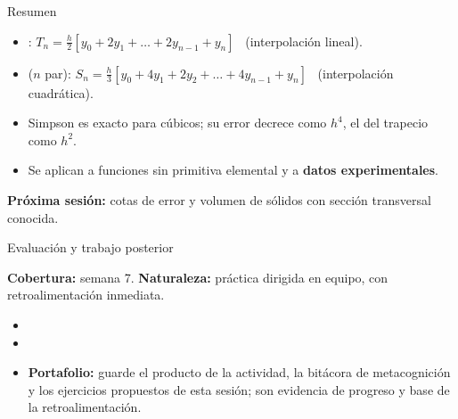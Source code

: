 \documentclass[10pt,aspectratio=169]{beamer}
\begin{document}
\begin{frame}{Resumen}
  \begin{itemize}
    \item {}: $T_n=\frac h2[y_0+2y_1+\dots+2y_{n-1}+y_n]$ \ (interpolación lineal).
    \item {} ($n$ par): $S_n=\frac h3[y_0+4y_1+2y_2+\dots+4y_{n-1}+y_n]$ \ (interpolación cuadrática).
    \item Simpson es exacto para cúbicos; su error decrece como $h^4$, el del trapecio como $h^2$.
    \item Se aplican a funciones sin primitiva elemental y a \textbf{datos experimentales}.
  \end{itemize}
  \vspace{3mm}
  \textbf{Próxima sesión:} cotas de error y volumen de sólidos con sección transversal conocida.
\end{frame}


\begin{frame}{Evaluación y trabajo posterior}
  \small
  \begin{evalbox}
    \textbf{Cobertura:} semana 7. \textbf{Naturaleza:} práctica dirigida en equipo, con retroalimentación inmediata.
  \end{evalbox}
  \begin{itemize}
    \item \criterios
    \item \declaracionia
    \item \textbf{Portafolio:} guarde el producto de la actividad, la bitácora de metacognición y los ejercicios propuestos de esta sesión; son evidencia de progreso y base de la retroalimentación.
  \end{itemize}
\end{frame}
\end{document}
